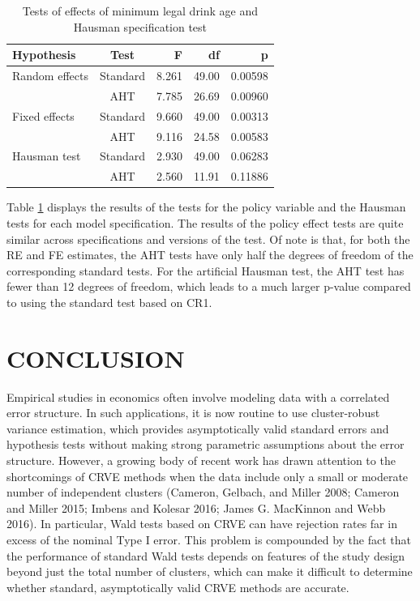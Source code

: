 \documentclass[12pt]{article}
\begin{document}
\begin{table}[bth]
\centering
\caption{Tests of effects of minimum legal drink age and Hausman specification test} 
\label{tab:MLDA}
\begin{tabular}{lcrrr}
  \toprule
Hypothesis & Test & F & df & p \\ 
  \midrule
Random effects & Standard & 8.261 & 49.00 & 0.00598 \\ 
   & AHT & 7.785 & 26.69 & 0.00960 \\ 
  Fixed effects & Standard & 9.660 & 49.00 & 0.00313 \\ 
   & AHT & 9.116 & 24.58 & 0.00583 \\ 
   \midrule
Hausman test & Standard & 2.930 & 49.00 & 0.06283 \\ 
   & AHT & 2.560 & 11.91 & 0.11886 \\ 
   \bottomrule
\end{tabular}
\end{table}

Table \ref{tab:MLDA} displays the results of the tests for the policy
variable and the Hausman tests for each model specification. The results
of the policy effect tests are quite similar across specifications and
versions of the test. Of note is that, for both the RE and FE estimates,
the AHT tests have only half the degrees of freedom of the corresponding
standard tests. For the artificial Hausman test, the AHT test has fewer
than 12 degrees of freedom, which leads to a much larger p-value
compared to using the standard test based on CR1.

\hypertarget{sec:conclusion}{%
\section{CONCLUSION}\label{sec:conclusion}}

Empirical studies in economics often involve modeling data with a
correlated error structure. In such applications, it is now routine to
use cluster-robust variance estimation, which provides asymptotically
valid standard errors and hypothesis tests without making strong
parametric assumptions about the error structure. However, a growing
body of recent work has drawn attention to the shortcomings of CRVE
methods when the data include only a small or moderate number of
independent clusters (Cameron, Gelbach, and Miller 2008; Cameron and
Miller 2015; Imbens and Kolesar 2016; James G. MacKinnon and Webb 2016).
In particular, Wald tests based on CRVE can have rejection rates far in
excess of the nominal Type I error. This problem is compounded by the
fact that the performance of standard Wald tests depends on features of
the study design beyond just the total number of clusters, which can
make it difficult to determine whether standard, asymptotically valid
CRVE methods are accurate.
\end{document}
